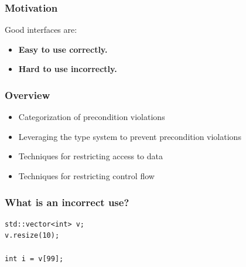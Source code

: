 \documentclass[aspectratio=169]{beamer}
\newif\iftransitions
\newcommand{\cpause}{\iftransitions \pause \fi}
\begin{document}
\begin{frame}

  \frametitle{Motivation}
  
  Good interfaces are: \vspace{20pt}
  \begin{itemize}
    \item \textbf{Easy to use correctly.} \vspace{20pt}
    \cpause
    \item \textbf{Hard to use incorrectly.}
  \end{itemize}
  

\end{frame}


\begin{frame}
  \frametitle{Overview}
  \begin{itemize}
    \item Categorization of precondition violations
    \item Leveraging the type system to prevent precondition violations
    \item Techniques for restricting access to data
    \item Techniques for restricting control flow
    \end{itemize}
\end{frame}

\begin{frame}[fragile]
  \frametitle{What is an incorrect use?}
  
  \begin{lstlisting}[style=cpp20]
std::vector<int> v;
v.resize(10);

int i = v[99];
  \end{lstlisting}
\end{frame}
\end{document}
